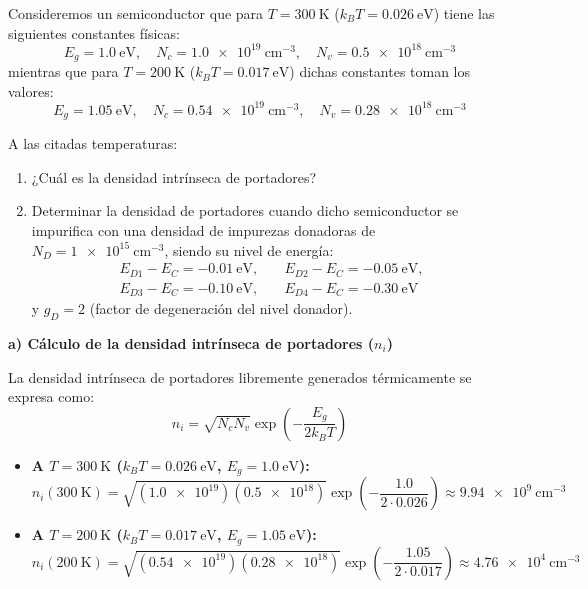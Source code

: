 \newpage
\begin{problema}
Consideremos un semiconductor que para $T = \SI{300}{\kelvin}$ ($k_B T = \SI{0.026}{\eV}$) tiene las siguientes constantes físicas:
\[
E_g = \SI{1.0}{\eV}, \quad N_c = \SI{1.0e19}{\cm^{-3}}, \quad N_v = \SI{0.5e18}{\cm^{-3}}
\]
mientras que para $T = \SI{200}{\kelvin}$ ($k_B T = \SI{0.017}{\eV}$) dichas constantes toman los valores:
\[
E_g = \SI{1.05}{\eV}, \quad N_c = \SI{0.54e19}{\cm^{-3}}, \quad N_v = \SI{0.28e18}{\cm^{-3}}
\]

A las citadas temperaturas:
\begin{enumerate}[label=\alph*)]
    \item ¿Cuál es la densidad intrínseca de portadores?
    \item Determinar la densidad de portadores cuando dicho semiconductor se impurifica con una densidad de impurezas donadoras de $N_D = \SI{1e15}{\cm^{-3}}$, siendo su nivel de energía:
    \[
    \begin{array}{ll}
        E_{D1} - E_C = \SI{-0.01}{\eV}, & \quad E_{D2} - E_C = \SI{-0.05}{\eV},\\[4pt]
        E_{D3} - E_C = \SI{-0.10}{\eV}, & \quad E_{D4} - E_C = \SI{-0.30}{\eV}
    \end{array}
    \]
    y $g_D = 2$ (factor de degeneración del nivel donador).
\end{enumerate}

\tcblower

\textbf{a) Cálculo de la densidad intrínseca de portadores ($n_i$)}

La densidad intrínseca de portadores libremente generados térmicamente se expresa como:
\[
n_i = \sqrt{N_c N_v} \exp\left( -\frac{E_g}{2 k_B T} \right)
\]

\begin{itemize}
    \item \textbf{A $T = \SI{300}{\kelvin}$ ($k_B T = \SI{0.026}{\eV}$, $E_g = \SI{1.0}{\eV}$):}
    \[
    n_i(\SI{300}{\kelvin}) = \sqrt{(\num{1.0e19}) (\num{0.5e18})} \exp\left( -\frac{1.0}{2 \cdot 0.026} \right) \approx \SI{9.94e9}{\cm^{-3}}
    \]

    \item \textbf{A $T = \SI{200}{\kelvin}$ ($k_B T = \SI{0.017}{\eV}$, $E_g = \SI{1.05}{\eV}$):}
    \[
    n_i(\SI{200}{\kelvin}) = \sqrt{(\num{0.54e19}) (\num{0.28e18})} \exp\left( -\frac{1.05}{2 \cdot 0.017} \right) \approx \SI{4.76e4}{\cm^{-3}}
    \]
\end{itemize}


\end{problema}
